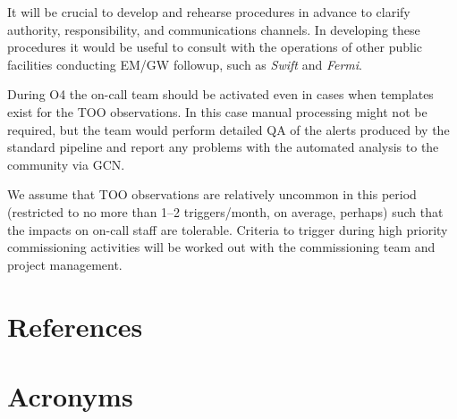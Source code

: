 \documentclass[DM,authoryear,toc]{lsstdoc}
\begin{document}
It will be crucial to develop and rehearse procedures in advance to clarify authority, responsibility, and communications channels. 
In developing these procedures it would be useful to consult with the operations of other public facilities conducting EM/GW followup, such as \textit{Swift} and \textit{Fermi}.

During O4 the on-call team should be activated even in cases when templates exist for the TOO observations.
In this case manual processing might not be required, but the team would perform detailed QA of the alerts produced by the standard pipeline and report any problems with the automated analysis to the community via GCN.

We assume that TOO observations are relatively uncommon in this period (restricted to no more than 1--2 triggers/month, on average, perhaps) such that the impacts on on-call staff are tolerable.  
Criteria to trigger during high priority commissioning activities will be worked out with the commissioning team and project management.


\appendix
\section{References} \label{sec:bib}
\renewcommand{\refname}{} %


\section{Acronyms} \label{sec:acronyms}

\end{document}
